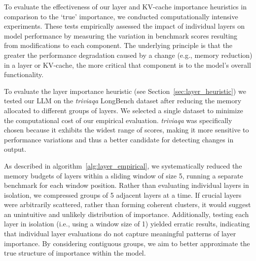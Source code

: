 To evaluate the effectiveness of our layer and KV-cache importance heuristics in comparison to the `true' importance, we conducted computationally intensive experiments. These tests empirically assessed the impact of individual layers
on model performance by measuring the variation in benchmark scores resulting from modifications to each component. The underlying principle is that the greater the performance degradation caused by a change (e.g., memory reduction) in a layer or KV-cache, the more critical that component is to the model’s overall functionality. 



To evaluate the layer importance heuristic (see Section~\ref{sec:layer_heuristic})  we tested our LLM on the \textit{triviaqa} LongBench dataset after reducing the memory allocated to different groups of layers. We selected a single dataset to minimize the computational cost of our empirical evaluation. \textit{triviaqa} was specifically chosen because it exhibits the widest range of scores, making it more sensitive to performance variations and thus a better candidate for detecting changes in output.

As described in algorithm~\ref{alg:layer_empirical}, we systematically reduced the memory budgets of layers within a sliding window of size 5, running a separate benchmark for each window position. Rather than evaluating individual layers in isolation, we compressed groups of 5 adjacent layers at a time. If crucial layers were arbitrarily scattered, rather than forming coherent clusters, it would suggest an unintuitive and unlikely distribution of importance. Additionally, testing each layer in isolation (i.e., using a window size of 1) yielded erratic results, indicating that individual layer evaluations do not capture meaningful patterns of layer importance. By considering contiguous groups, we aim to better approximate the true structure of importance within the model.




 



